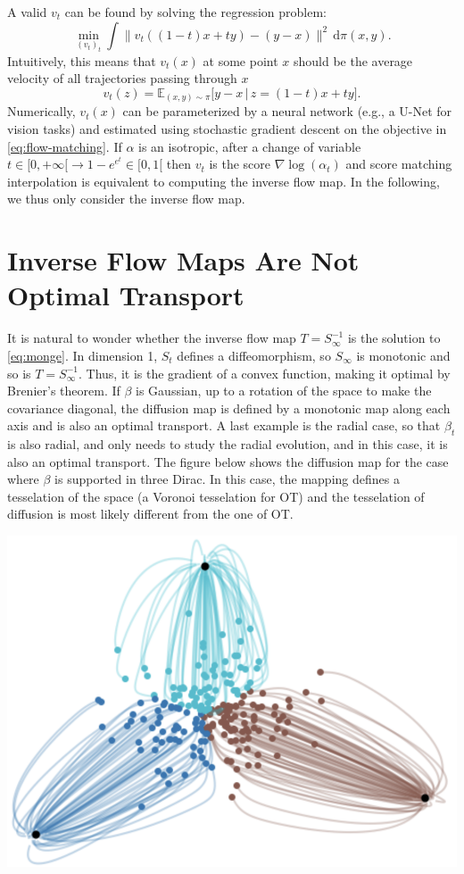 \documentclass{article}
\begin{document}
A valid $v_t$ can be found by solving the regression problem:
\begin{equation}
    \min_{(v_t)_t} \int \|v_t((1-t)x + ty) - (y - x)\|^2 \, \mathrm{d}\pi(x, y). \label{eq:flow-matching}
\end{equation}
Intuitively, this means that $v_t(x)$ at some point $x$ should be the average velocity of all trajectories passing through $x$
$$
		v_t(z) = \mathbb{E}_{(x, y) \sim \pi} \big[ y - x \, \big| \, z = (1-t)x + t y \big].
$$
Numerically, $v_t(x)$ can be parameterized by a neural network (e.g., a U-Net for vision tasks) and estimated using stochastic gradient descent on the objective in \eqref{eq:flow-matching}.
%
If $\alpha$ is an isotropic, after a change of variable $t \in [0,+\infty[ \to 1-e^{e^{t}} \in [0,1[$ then $v_t$ is the score $\nabla \log(\alpha_t)$ and score matching interpolation is equivalent to computing the inverse flow map. In the following, we thus only consider the inverse flow map.

\section{Inverse Flow Maps Are Not Optimal Transport}

It is natural to wonder whether the inverse flow map $T=S_\infty^{-1}$ is the solution to \eqref{eq:monge}. In dimension 1, $S_t$ defines a diffeomorphism, so $S_\infty$ is monotonic and so is $T=S_\infty^{-1}$. Thus, it is the gradient of a convex function, making it optimal by Brenier's theorem. If $\beta$ is Gaussian, up to a rotation of the space to make the covariance diagonal, the diffusion map is defined by a monotonic map along each axis and is also an optimal transport. A last example is the radial case, so that $\beta_t$ is also radial, and only needs to study the radial evolution, and in this case, it is also an optimal transport.
%
The figure below shows the diffusion map for the case where $\beta$ is supported in three Dirac. In this case, the mapping defines a tesselation of the space (a Voronoi tesselation for OT) and the tesselation of diffusion is most likely different from the one of OT.   

\begin{center}
\includegraphics[width=.5\linewidth]{3-diracs.png}
\end{center}
\end{document}
